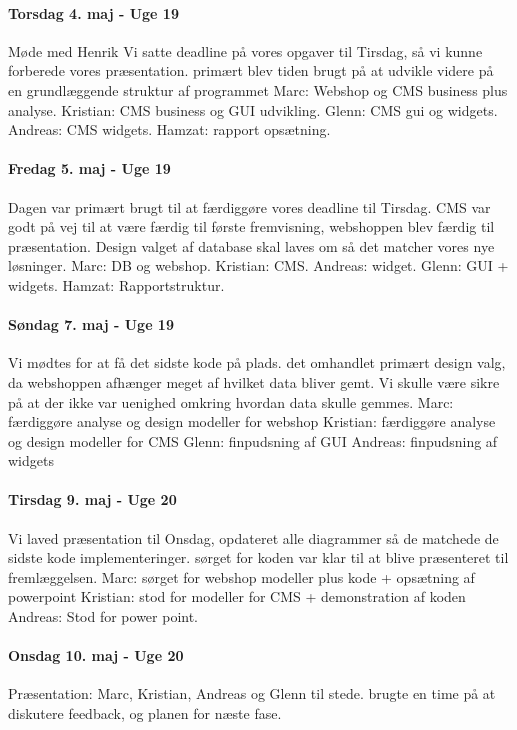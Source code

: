 \paragraph{Torsdag 4. maj - Uge 19}
Møde med Henrik
Vi satte deadline på vores opgaver til Tirsdag, så vi kunne forberede vores præsentation.
primært blev tiden brugt på at udvikle videre på en grundlæggende struktur af programmet
Marc: Webshop og CMS business plus analyse. 
Kristian: CMS business og GUI udvikling.
Glenn: CMS gui og widgets.
Andreas: CMS widgets.
Hamzat: rapport opsætning.
 
\paragraph{Fredag 5. maj - Uge 19}
Dagen var primært brugt til at færdiggøre vores deadline til Tirsdag. CMS var godt på vej til at være færdig til første fremvisning, webshoppen blev færdig til præsentation.
Design valget af database skal laves om så  det matcher vores nye løsninger.
Marc: DB og webshop.
Kristian: CMS.
Andreas: widget.
Glenn: GUI + widgets.
Hamzat: Rapportstruktur.
 
\paragraph{Søndag 7. maj - Uge 19}
Vi mødtes for at få det sidste kode på plads. det omhandlet primært design valg,  da webshoppen afhænger meget af hvilket data bliver gemt. 
Vi skulle være sikre på at der ikke var uenighed omkring hvordan data skulle gemmes.
Marc: færdiggøre analyse og design modeller for webshop
Kristian: færdiggøre analyse og design modeller for CMS
Glenn: finpudsning af GUI
Andreas: finpudsning af widgets
 
\paragraph{Tirsdag 9. maj - Uge 20}
Vi laved præsentation til Onsdag, opdateret alle diagrammer så de matchede de sidste kode implementeringer. sørget for koden var klar til at blive præsenteret til  fremlæggelsen.
Marc: sørget for webshop modeller plus kode + opsætning af powerpoint
Kristian: stod for modeller for CMS + demonstration af koden
Andreas: Stod for power point.
 
\paragraph{Onsdag 10. maj - Uge 20}
Præsentation: Marc, Kristian, Andreas og Glenn til stede.
brugte en time på at diskutere feedback, og planen for næste fase.
 
